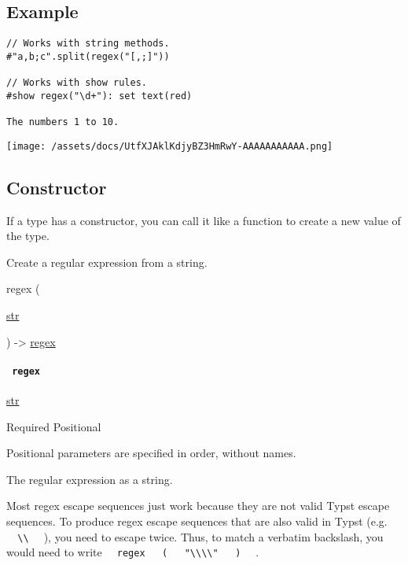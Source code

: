 \subsection{Example}\label{example}

\begin{verbatim}
// Works with string methods.
#"a,b;c".split(regex("[,;]"))

// Works with show rules.
#show regex("\d+"): set text(red)

The numbers 1 to 10.
\end{verbatim}

\texttt{[image: /assets/docs/UtfXJAklKdjyBZ3HmRwY-AAAAAAAAAAA.png]}

\subsection{\texorpdfstring{Constructor
{}}{Constructor }}\label{constructor}

\label{constructor-constructor-tooltip}
If a type has a constructor, you can call it like a function to create a
new value of the type.

Create a regular expression from a string.

{ regex } (

{ \href{/docs/reference/foundations/str/}{str} }

) -\textgreater{} \href{/docs/reference/foundations/regex/}{regex}

\paragraph{\texorpdfstring{\texttt{\ regex\ }}{ regex }}\label{constructor-regex}

\href{/docs/reference/foundations/str/}{str}

{Required} {{ Positional }}

\label{constructor-regex-positional-tooltip}
Positional parameters are specified in order, without names.

The regular expression as a string.

Most regex escape sequences just work because they are not valid Typst
escape sequences. To produce regex escape sequences that are also valid
in Typst (e.g.
\texttt{\ }{\texttt{\ \textbackslash{}\textbackslash{}\ }}\texttt{\ } ),
you need to escape twice. Thus, to match a verbatim backslash, you would
need to write
\texttt{\ }{\texttt{\ regex\ }}\texttt{\ }{\texttt{\ (\ }}\texttt{\ }{\texttt{\ "\textbackslash{}\textbackslash{}\textbackslash{}\textbackslash{}"\ }}\texttt{\ }{\texttt{\ )\ }}\texttt{\ }
.

